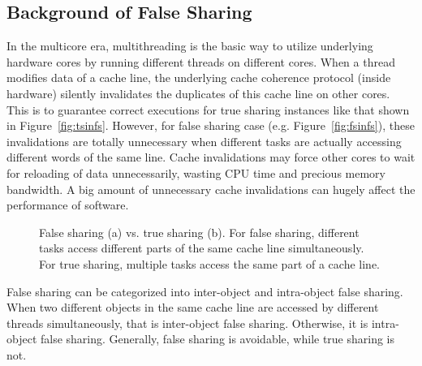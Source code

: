 \label{sec:overview}

\subsection{Background of False Sharing}

In the multicore era, multithreading is the basic way to utilize underlying hardware cores by running different threads on different cores. When a thread modifies data of a cache line, the underlying cache coherence protocol (inside hardware) silently invalidates the duplicates of this cache line on other cores. This is to guarantee correct executions for true sharing instances like that shown in Figure~\ref{fig:tsinfs}. However, for false sharing case (e.g. Figure~\ref{fig:fsinfs}), these invalidations are totally unnecessary when different tasks are actually accessing different words of the same line. Cache invalidations may force other cores to wait for reloading of data unnecessarily, wasting CPU time and precious memory bandwidth. A big amount of unnecessary cache invalidations can hugely affect the performance of software. %

\begin{figure}[htbp]
\centering
{}%
\hspace{30pt}
%
\caption{False sharing (a) vs. true sharing (b). For false sharing, different tasks access different parts of the same cache line simultaneously. For true sharing, multiple tasks access the same part of a cache line.\label{fig:falsesharing}}
\end{figure}

False sharing can be categorized into inter-object and intra-object false sharing. When two different objects in the same cache line are accessed by different threads simultaneously, that is inter-object false sharing. Otherwise, it is intra-object false sharing. Generally, false sharing is avoidable, while true sharing is not. 

